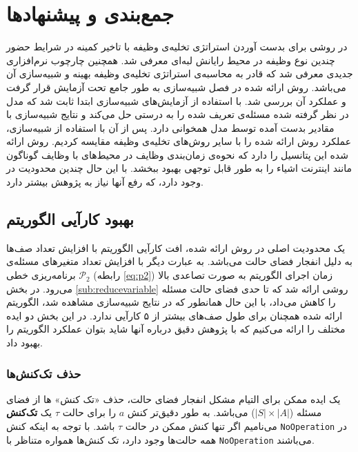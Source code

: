 \chapter{جمع‌بندی و پیشنهاد‌ها}
در \CurrentProject روشی برای بدست آوردن استراتژی تخلیه‌ی وظیفه با تاخیر کمینه در شرایط حضور چندین نوع وظیفه در محیط رایانش لبه‌ای معرفی شد. همچنین چارچوب نرم‌افزاری جدیدی معرفی شد که قادر به محاسبه‌ی استراتژی تخلیه‌ی وظیفه بهینه و شبیه‌سازی آن می‌باشد. روش ارائه شده در فصل شبیه‌سازی به طور جامع تحت آزمایش قرار گرفت و عملکرد آن بررسی شد. با استفاده از آزمایش‌های شبیه‌سازی ابتدا ثابت شد که مدل در نظر گرفته شده مسئله‌ی تعریف شده را به درستی حل می‌کند و نتایج شبیه‌سازی با مقادیر بدست آمده توسط مدل همخوانی دارد. پس از آن با استفاده از شبیه‌سازی، عملکرد روش ارائه شده را با سایر روش‌های تخلیه‌ی وظیفه مقایسه کردیم. روش ارائه شده این پتانسیل را دارد که نحوه‌ی زمان‌بندی وظایف در محیط‌های با وظایف گوناگون مانند اینترنت اشیاء را به طور قابل توجهی بهبود ببخشد. با این حال چندین محدودیت در \CurrentProject وجود دارد، که رفع آنها نیاز به پژوهش بیشتر دارد. 

\section{بهبود کارآیی الگوریتم}
یک محدودیت اصلی در روش ارائه شده، افت کارآیی الگوریتم با افزایش تعداد صف‌ها به دلیل انفجار فضای حالت می‌باشد. به عبارت دیگر با افزایش تعداد متغیرهای مسئله‌ی برنامه‌ریزی خطی
$\mathcal{P}_2$
(رابطه \ref{eq:p2}) زمان اجرای الگوریتم به صورت تصاعدی بالا می‌رود. در بخش \ref{sub:reducevariable} روشی ارائه شد که تا حدی فضای حالت مسئله را کاهش می‌داد، با این حال همانطور که در نتایج شبیه‌سازی مشاهده شد، الگوریتم ارائه شده همچنان برای طول صف‌های بیشتر از ۵ کارآیی ندارد. در این بخش دو ایده مختلف را ارائه می‌کنیم که با پژوهش دقیق درباره آنها شاید بتوان عملکرد الگوریتم را بهبود داد.
\subsection{حذف تک‌کنش‌ها}
یک ایده ممکن برای التیام مشکل انفجار فضای حالت، حذف «تک کنش» ها از فضای مسئله ($|S| \times |A|$) می‌باشد. به طور دقیق‌تر کنش $a$ را برای حالت $\tau$ یک \textbf{تک‌کنش} می‌نامیم اگر تنها کنش ممکن در حالت $\tau$ باشد. با توجه به اینکه کنش \texttt{\footnotesize NoOperation} در همه حالت‌ها وجود دارد، تک کنش‌ها همواره متناظر با \texttt{\footnotesize NoOperation} می‌باشند. \\

